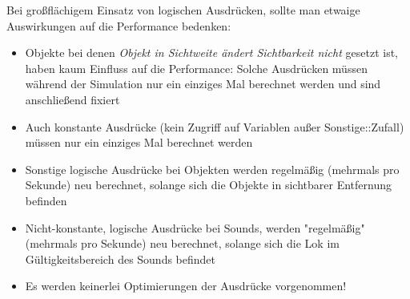 Bei großflächigem Einsatz von logischen Ausdrücken, sollte man etwaige
Auswirkungen auf die Performance bedenken:

\begin{itemize}
\item
  Objekte bei denen \emph{Objekt in Sichtweite ändert Sichtbarkeit
  nicht} gesetzt ist, haben kaum Einfluss auf die Performance: Solche
  Ausdrücken müssen während der Simulation nur ein einziges Mal
  berechnet werden und sind anschließend fixiert
\item
  Auch konstante Ausdrücke (kein Zugriff auf Variablen außer
  Sonstige::Zufall) müssen nur ein einziges Mal berechnet werden
\item
  Sonstige logische Ausdrücke bei Objekten werden regelmäßig (mehrmals
  pro Sekunde) neu berechnet, solange sich die Objekte in sichtbarer
  Entfernung befinden
\item
  Nicht-konstante, logische Ausdrücke bei Sounds, werden "regelmäßig"
  (mehrmals pro Sekunde) neu berechnet, solange sich die Lok im
  Gültigkeitsbereich des Sounds befindet
\item
  Es werden keinerlei Optimierungen der Ausdrücke vorgenommen!
\end{itemize}